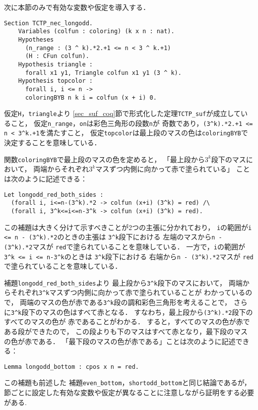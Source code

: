 次に本節のみで有効な変数や仮定を導入する．
\begin{lstlisting}[language=Coq]
  Section TCTP_nec_longodd.
    Variables (colfun : coloring) (k x n : nat).
    Hypotheses
      (n_range : (3 ^ k).*2.+1 <= n < 3 ^ k.+1)
      (H : CFun colfun).
    Hypothesis triangle :
      forall x1 y1, Triangle colfun x1 y1 (3 ^ k).
    Hypothesis topcolor :
      forall i, i <= n ->
      coloringBYB n k i = colfun (x + i) 0.
\end{lstlisting}
仮定{\tt{H}}，{\tt{triangle}}より
\ref{sec_suf_coq}節で形式化した定理{\tt{TCTP\_suf}}が成立していること，
仮定{\tt{n\_range}}，{\tt{on}}は彩色三角形の段数{\tt{n}}が
奇数であり，{\tt{(3\verb|^|k).*2.+1 <= n < 3\verb|^|k.+1}}を満たすこと，
仮定{\tt{topcolor}}は最上段のマスの色は{\tt{coloringBYB}}で
決定することを意味している．

関数{\tt{coloringBYB}}で最上段のマスの色を定めると，
「最上段から$3^k$段下のマスにおいて，
  両端からそれぞれ$3^k$マスずつ内側に向かって赤で塗られている」
ことは次のように記述できる：
\begin{lstlisting}[language=Coq]
  Let longodd_red_both_sides :
  (forall i, i<=n-(3^k).*2 -> colfun (x+i) (3^k) = red) /\
  (forall i, 3^k<=i<=n-3^k -> colfun (x+i) (3^k) = red).
\end{lstlisting}
この補題は大きく分けて示すべきことが2つの主張に分かれており，
{\tt{i}}の範囲が{\tt{i <= n - (3\verb|^|k).*2}}のときの主張は
{\tt{3\verb|^|k}}段下における
左端のマスから{\tt{n - (3\verb|^|k).*2}}マスが
{\tt{red}}で塗られていることを意味している．
一方で，{\tt{i}}の範囲が{\tt{3\verb|^|k <= i <= n-3\verb|^|k}}のときは
{\tt{3\verb|^|k}}段下における
右端から{\tt{n - (3\verb|^|k).*2}}マスが
{\tt{red}}で塗られていることを意味している．

補題{\tt{longodd\_red\_both\_sides}}より
最上段から{\tt{3\verb|^|k}}段下のマスにおいて，
両端からそれぞれ{\tt{3\verb|^|k}}マスずつ内側に向かって赤で塗られていることが
わかっているので，
両端のマスの色が赤である{\tt{3\verb|^|k}}段の調和彩色三角形を考えることで，
さらに{\tt{3\verb|^|k}}段下のマスの色はすべて赤となる．
すなわち，最上段から{\tt{(3\verb|^|k).*2}}段下のすべてのマスの色が
赤であることがわかる．
すると，すべてのマスの色が赤である段ができたので，
この段よりも下のマスはすべて赤となり，最下段のマスの色が赤である．
「最下段のマスの色が赤である」ことは次のように記述できる：
\begin{lstlisting}[language=Coq]
  Lemma longodd_bottom : cpos x n = red.
\end{lstlisting}
この補題も前述した
補題{\tt{even\_bottom}}，{\tt{shortodd\_bottom}}と同じ結論であるが，
節ごとに設定した有効な変数や仮定が異なることに注意しながら証明をする必要がある.

